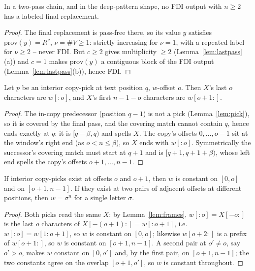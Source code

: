\begin{lemma}[elimination]
    \label{lem:elimination}
    In a two-pass chain, and in the deep-pattern shape, no FDI output
    with $n \geq 2$ has a labeled final replacement.
\end{lemma}

\begin{proof}
    The final replacement is pass-free there, so its value $y$
    satisfies $\mathrm{prov}(y) = R^{\nu}$, $\nu = \#V \geq 1$: strictly
    increasing for $\nu = 1$, with a repeated label for $\nu \geq 2$
    -- never FDI.  But $c \geq 2$ gives multiplicity $\geq 2$
    (Lemma~\ref{lem:lastpass}(a)) and $c = 1$ makes
    $\mathrm{prov}(y)$ a contiguous block of the FDI output
    (Lemma~\ref{lem:lastpass}(b)), hence FDI.
\end{proof}

\begin{lemma}[frames]
    \label{lem:frames}
    Let $p$ be an interior copy-pick at text position $q$,
    $w$-offset $o$.  Then $X$'s last $o$ characters are
    $w[:o]$, and $X$'s first $n-1-o$ characters are $w[o+1:]$.
\end{lemma}

\begin{proof}
    The in-copy predecessor (position $q-1$) is not a pick
    (Lemma~\ref{lem:pick}), so it is covered by the final pass, and
    the covering match cannot contain $q$, hence ends exactly at $q$:
    it is $[q-\beta, q)$ and spells $X$.  The copy's offsets
    $0, \ldots, o-1$ sit at the window's right end (as $o < n \leq
    \beta$), so $X$ ends with $w[:o]$.  Symmetrically the successor's
    covering match must start at $q+1$ and is $[q+1, q+1+\beta)$,
    whose left end spells the copy's offsets $o+1, \ldots, n-1$.
\end{proof}

\begin{lemma}[break]
    \label{lem:break}
    If interior copy-picks exist at offsets $o$ and $o+1$, then $w$ is
    constant on $[0, o]$ and on $[o+1, n-1]$.  If they exist at two
    pairs of adjacent offsets at different positions, then $w =
    \sigma^{n}$ for a single letter $\sigma$.
\end{lemma}

\begin{proof}
    Both picks read the same $X$: by Lemma~\ref{lem:frames},
    $w[:o] = X[-o:]$ is the last $o$ characters of $X[-(o+1):] =
    w[:o+1]$, i.e.\ $w[:o] = w[1:o+1]$, so $w$ is constant on $[0,o]$;
    likewise $w[o+2:]$ is a prefix of $w[o+1:]$, so $w$ is constant on
    $[o+1, n-1]$.  A second pair at $o' \neq o$, say $o' > o$, makes
    $w$ constant on $[0, o']$ and, by the first pair, on $[o+1,
    n-1]$; the two constants agree on the overlap $[o+1, o']$, so $w$
    is constant throughout.
\end{proof}

